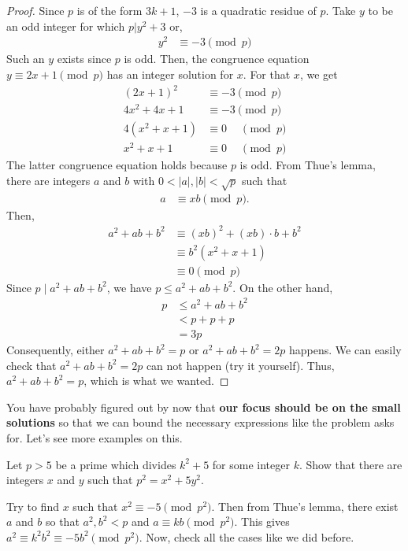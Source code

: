 \documentclass{subfile}
\begin{document}
	\begin{proof}
		Since $p$ is of the form $3k+1$, $-3$ is a quadratic residue of $p$. Take $y$ to be an odd integer for which $p|y^2+3$ or,
			\begin{align*}
				y^2 & \equiv-3\pmod p
			\end{align*}
		Such an $y$ exists since $p$ is odd. Then, the congruence equation $y\equiv2x+1\pmod p$ has an integer solution for $x$. For that $x$, we get
			\begin{align*}
				(2x+1)^2 & \equiv-3\pmod p\\
				4x^2+4x+1& \equiv-3\pmod p\\
				4(x^2+x+1)&\equiv 0 \phantom{-}\pmod p\\
				x^2+x+1	 & \equiv 0 \phantom{-}\pmod p
			\end{align*}
		The latter congruence equation holds because $p$ is odd. From Thue's lemma, there are integers $a$ and $b$ with $0<|a|,|b|< \sqrt p$ such that
			\begin{align*}
				a & \equiv xb\pmod p.
			\end{align*}
		Then,
			\begin{align*}
				a^2+ab+b^2  & \equiv (xb)^2+(xb)\cdot b+b^2\\
				& \equiv b^2(x^2+x+1)\\
				& \equiv 0\pmod p
			\end{align*}
		Since $p\mid a^2+ab+b^2$, we have $p\leq a^2+ab+b^2$. On the other hand,
			\begin{align*}
				p& \leq a^2+ab+b^2 \\
				& < p+p+p \\
				&= 3p
			\end{align*}
		Consequently, either $a^2+ab+b^2=p$ or $a^2+ab+b^2=2p$ happens. We can easily check that $a^2+ab+b^2=2p$ can not happen (try it yourself). Thus, $a^2+ab+b^2=p$, which is what we wanted.
	\end{proof}

	You have probably figured out by now that \textbf{our focus should be on the small solutions} so that we can bound the necessary expressions like the problem asks for. Let's see more examples on this.

	\begin{theorem}
		Let $p>5$ be a prime which divides $k^2+5$ for some integer $k$. Show that there are integers $x$ and $y$ such that $p^2=x^2+5y^2$.
	\end{theorem}

	\begin{hint}
		Try to find $x$ such that $x^2\equiv-5\pmod{p^2}$. Then from Thue's lemma, there exist $a$ and $b$ so that $a^2,b^2<p$ and $a\equiv kb\pmod{p^2}$. This gives $a^2\equiv k^2b^2\equiv-5b^2\pmod{p^2}$. Now, check all the cases like we did before.
	\end{hint}
\end{document}
